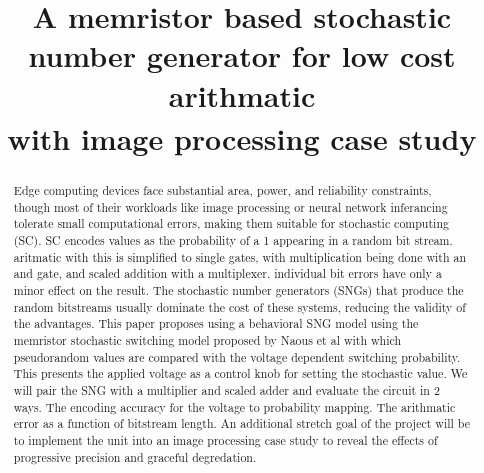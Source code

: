\documentclass[conference]{IEEEtran}
\begin{document}
\title{A memristor based stochastic number generator for low cost arithmatic \\
{\footnotesize \textsuperscript{}with image processing case study}
}

\author{
\and
{}
\and
{}
}

\maketitle

\begin{abstract}
    Edge computing devices face substantial area, power, and reliability constraints,
    though most of their workloads like image processing or neural network inferancing
    tolerate small computational errors, making them suitable for stochastic 
    computing (SC). SC encodes values as the probability of a 1 appearing in a random
    bit stream. aritmatic with this is simplified to single gates, with multiplication
    being done with an and gate, and scaled addition with a
    multiplexer. individual bit errors have only a minor effect on the result.
    The stochastic number generators (SNGs) that produce the random bitstreams usually
    dominate the cost of these systems, reducing the validity of the advantages. 
    This paper proposes using a behavioral SNG model using the memristor stochastic
    switching model proposed by Naous et al with which
    pseudorandom values are compared with the voltage dependent switching probability.
    This presents the applied voltage as a control knob for setting the stochastic value.
    We will pair the SNG with a multiplier and scaled adder and evaluate the circuit
    in 2 ways. The encoding accuracy for the voltage to probability mapping. 
    The arithmatic error as a function of bitstream length.
    An additional stretch goal of the project will be to implement the unit into
    an image processing case study to reveal the effects of progressive precision
    and graceful degredation.

\end{abstract}
\end{document}
